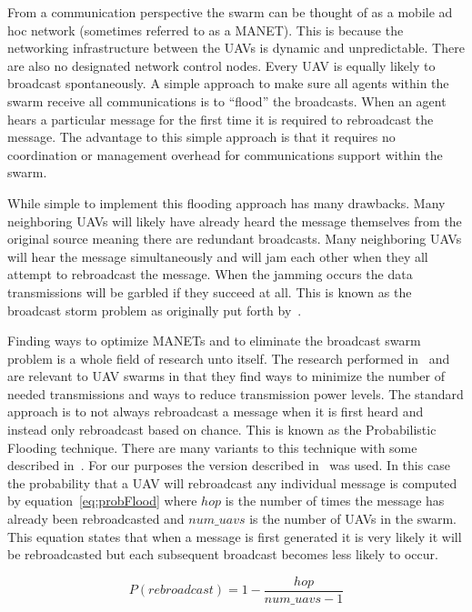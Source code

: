 From a communication perspective the swarm can be thought of as a mobile ad hoc network (sometimes referred to as a MANET).  This is because the networking infrastructure between the UAVs is dynamic and unpredictable.  There are also no designated network control nodes.  Every UAV is equally likely to broadcast spontaneously.  A simple approach to make sure all agents within the swarm receive all communications is to ``flood'' the broadcasts.  When an agent hears a particular message for the first time it is required to rebroadcast the message.  The advantage to this simple approach is that it requires no coordination or management overhead for communications support within the swarm.

While simple to implement this flooding approach has many drawbacks.  Many neighboring UAVs will likely have already heard the message themselves from the original source meaning there are redundant broadcasts.  Many neighboring UAVs will hear the message simultaneously and will jam each other when they all attempt to rebroadcast the message.  When the jamming occurs the data transmissions will be garbled if they succeed at all.  This is known as the broadcast storm problem as originally put forth by~\cite{bstorm}.

Finding ways to optimize MANETs and to eliminate the broadcast swarm problem is a whole field of research unto itself.  The research performed in~\cite{epidemicManets} and ~\cite{analysisOptNodeDen} are relevant to UAV swarms in that they find ways to minimize the number of needed transmissions and ways to reduce transmission power levels.  The standard approach is to not always rebroadcast a message when it is first heard and instead only rebroadcast based on chance.  This is known as the Probabilistic Flooding technique.  There are many variants to this technique with some described in~\cite{probFloodVariants}.  For our purposes the version described in~\cite{simpleProbFlood} was used.  In this case the probability that a UAV will rebroadcast any individual message is computed by equation~\ref{eq:probFlood} where $hop$ is the number of times the message has already been rebroadcasted and $num\_uavs$ is the number of UAVs in the swarm.  This equation states that when a message is first generated it is very likely it will be rebroadcasted but each subsequent broadcast becomes less likely to occur.

\begin{equation}
\label{eq:probFlood}
P(rebroadcast) = 1 - \frac{hop}{num\_uavs - 1}
\end{equation}

